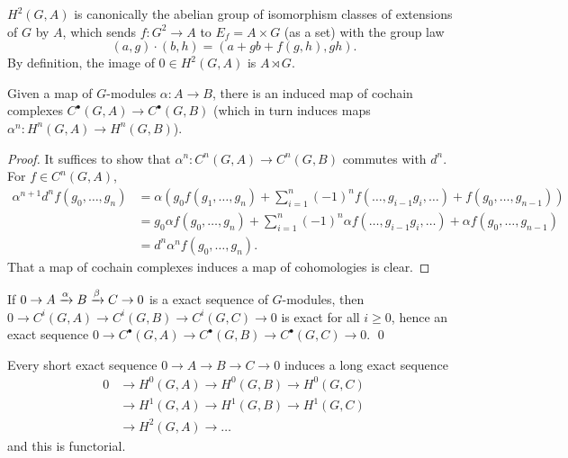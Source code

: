 \documentclass[11pt]{amsart}
\begin{document}
\begin{prop}
    $H^2(G,A)$ is canonically the abelian group of isomorphism classes of extensions of $G$ by $A$, which sends $f:G^2\to A$ to $E_f = A\times G$ (as a set) with the group law
    \[(a,g)\cdot (b,h) = (a + gb + f(g,h), gh).\]
    By definition, the image of $0\in H^2(G,A)$ is $A\rtimes G$.
\end{prop}


\begin{lem}
    Given a map of $G$-modules $\alpha:A\to B$, there is an induced map of cochain complexes $C^\bullet(G,A)\to C^\bullet(G,B)$  (which in turn induces maps $\alpha^n: H^n(G,A)\to H^n(G,B)$).
\end{lem}

\begin{proof}
    It suffices to show that $\alpha^n: C^n(G,A)\to C^n(G,B)$ commutes with $d^n$. For $f\in C^n(G,A)$,
    \begin{align*}
    \alpha^{n+1}d^nf(g_0,\dots, g_n) &= \alpha(g_0f(g_1,\dots,g_n) + \sum_{i=1}^n (-1)^n f(\dots, g_{i-1}g_i, \dots) + f(g_0,\dots,g_{n-1})) \\
    &= g_0\alpha f(g_0,\dots, g_n) + \sum_{i=1}^n (-1)^n \alpha f(\dots, g_{i-1}g_i, \dots) + \alpha f(g_0,\dots,g_{n-1}) \\
    &= d^n\alpha^nf(g_0,\dots,g_n).
    \end{align*}
    That a map of cochain complexes induces a map of cohomologies is clear.
\end{proof}

\begin{lem}
    If $0\to A\xrightarrow{\alpha} B\xrightarrow{\beta} C\to 0$ is a exact sequence of $G$-modules, then $0\to C^i(G,A)\to C^i(G,B)\to C^i(G,C)\to 0$ is exact for all $i\ge 0$, hence an exact sequence $0\to C^\bullet(G,A) \to C^\bullet(G,B) \to C^\bullet(G,C)\to 0$. \qed
\end{lem}

\begin{thm}
    Every short exact sequence $0\to A\to B\to C\to 0$ induces a long exact sequence
    \begin{align*}
        0 &\to H^0(G,A) \to H^0(G,B) \to H^0(G,C) \\
        &\to H^1(G,A) \to H^1(G,B) \to H^1(G,C) \\
        &\to H^2(G,A) \to \dots
    \end{align*}
    and this is functorial.
\end{thm}
\end{document}
